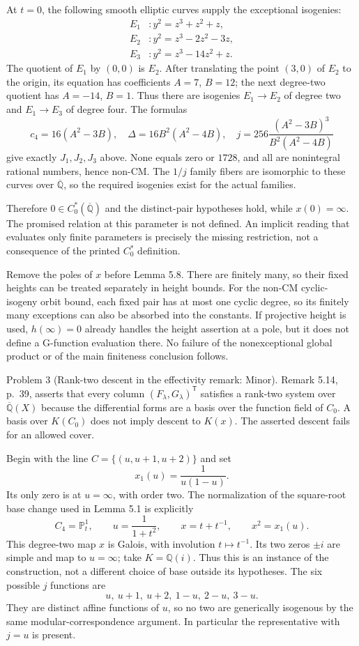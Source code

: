 \documentclass[10pt]{article}
\begin{document}
At \(t=0\), the following smooth elliptic curves supply the exceptional isogenies: \[\begin{aligned}
 E_1&:y^2=z^3+z^2+z,\\
 E_2&:y^2=z^3-2z^2-3z,\\
 E_3&:y^2=z^3-14z^2+z.
\end{aligned}\] The quotient of \(E_1\) by \((0,0)\) is \(E_2\). After translating the point \((3,0)\) of \(E_2\) to the origin, its equation has coefficients \(A=7\), \(B=12\); the next degree-two quotient has \(A=-14\), \(B=1\). Thus there are isogenies \(E_1\to E_2\) of degree two and \(E_1\to E_3\) of degree four. The formulas \[c_4=16(A^2-3B),\quad
 \Delta=16B^2(A^2-4B),\quad
 j=256\frac{(A^2-3B)^3}{B^2(A^2-4B)}\] give exactly \(J_1,J_2,J_3\) above. None equals zero or \(1728\), and all are nonintegral rational numbers, hence non-CM. The \(1/j\) family fibers are isomorphic to these curves over \(\overline{\mathbb Q}\), so the required isogenies exist for the actual families.\par
Therefore \(0\in C_0^*(\overline{\mathbb Q})\) and the distinct-pair hypotheses hold, while \(x(0)=\infty\). The promised relation at this parameter is not defined. An implicit reading that evaluates only finite parameters is precisely the missing restriction, not a consequence of the printed \(C_0^*\) definition.\par
Remove the poles of \(x\) before Lemma 5.8. There are finitely many, so their fixed heights can be treated separately in height bounds. For the non-CM cyclic-isogeny orbit bound, each fixed pair has at most one cyclic degree, so its finitely many exceptions can also be absorbed into the constants. If projective height is used, \(h(\infty)=0\) already handles the height assertion at a pole, but it does not define a G-function evaluation there. No failure of the nonexceptional global product or of the main finiteness conclusion follows.\par
Problem 3 (Rank-two descent in the effectivity remark: Minor).  Remark 5.14, p. 39, asserts that every column \((F_\lambda,G_\lambda)^{\mathsf T}\) satisfies a rank-two system over \(\overline{\mathbb Q}(X)\) because the differential forms are a basis over the function field of \(C_0\). A basis over \(K(C_0)\) does not imply descent to \(K(x)\). The asserted descent fails for an allowed cover.\par
Begin with the line \(C=\{(u,u+1,u+2)\}\) and set \[x_1(u)=\frac1{u(1-u)}.\] Its only zero is at \(u=\infty\), with order two. The normalization of the square-root base change used in Lemma 5.1 is explicitly \[C_4=\mathbb P^1_t,\qquad
 u=\frac1{1+t^2},\qquad x=t+t^{-1},\qquad x^2=x_1(u).\] This degree-two map \(x\) is Galois, with involution \(t\mapsto t^{-1}\). Its two zeros \(\pm i\) are simple and map to \(u=\infty\); take \(K=\mathbb Q(i)\). Thus this is an instance of the construction, not a different choice of base outside its hypotheses. The six possible \(j\) functions are \[u,\ u+1,\ u+2,\ 1-u,\ 2-u,\ 3-u.\] They are distinct affine functions of \(u\), so no two are generically isogenous by the same modular-correspondence argument. In particular the representative with \(j=u\) is present.\par
\end{document}
